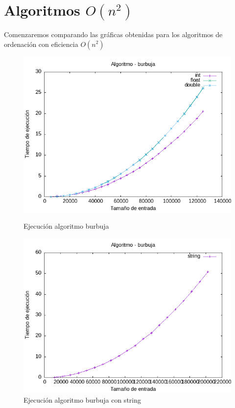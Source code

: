 \documentclass[11pt,openany]{book}
\begin{document}
\section{Algoritmos  \(O(n^2)\)}
Comenzaremos comparando las gráficas obtenidas para los algoritmos de ordenación con eficiencia \(O(n^2)\)
\begin{figure}[H]
    \begin{minipage}{0.5\textwidth}
        \centering
        \includegraphics[width=\linewidth]{assets/Img/burbuja.png}
        \caption{Ejecución algoritmo burbuja}
        \label{fig:burbuja}
    \end{minipage}%
    \begin{minipage}{0.5\textwidth}
        \centering
        \includegraphics[width=\linewidth]{assets/Img/burbujastring.png}
        \caption{Ejecución algoritmo burbuja con string}
        \label{fig:burbujastring}
    \end{minipage}
\end{figure}
\end{document}

